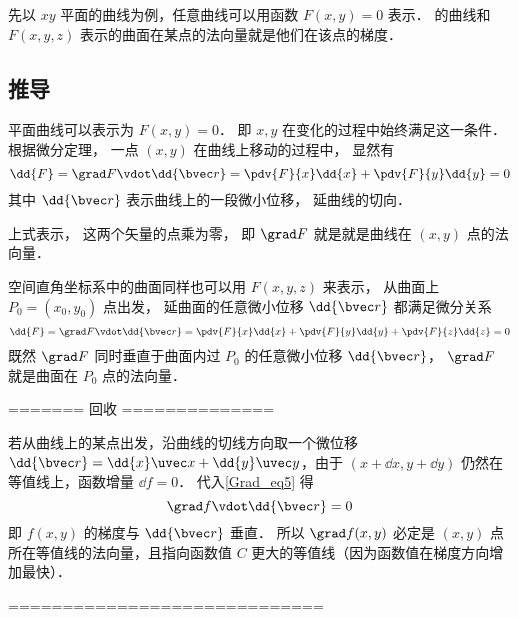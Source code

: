 
\begin{issues}
\issueDraft
\end{issues}


先以 $xy$ 平面的曲线为例，任意曲线可以用函数 $F(x, y) = 0$ 表示． 的曲线和 $F(x, y, z)$ 表示的曲面在某点的法向量就是他们在该点的梯度．

\subsection{推导}

平面曲线可以表示为 $F(x, y) = 0$． 即 $x, y$ 在变化的过程中始终满足这一条件． 根据微分定理， 一点 $(x, y)$ 在曲线上移动的过程中， 显然有
\begin{equation}
\dd{F} = \grad F \vdot \dd{\bvec r} = \pdv{F}{x} \dd{x} + \pdv{F}{y} \dd{y} = 0
\end{equation}
其中 $\dd{\bvec r}$ 表示曲线上的一段微小位移， 延曲线的切向．

上式表示， 这两个矢量的点乘为零， 即 $\grad F$ 就是就是曲线在 $(x,y)$ 点的法向量．

空间直角坐标系中的曲面同样也可以用 $F(x, y, z)$ 来表示， 从曲面上 $P_0 = (x_0, y_0)$ 点出发， 延曲面的任意微小位移 $\dd{\bvec r}$ 都满足微分关系
\begin{equation}
\dd{F} = \grad F \vdot \dd{\bvec r} = \pdv{F}{x} \dd{x} + \pdv{F}{y} \dd{y} + \pdv{F}{z} \dd{z} = 0
\end{equation}
既然 $\grad F$ 同时垂直于曲面内过 $P_0$ 的任意微小位移 $\dd{\bvec r}$， $\grad F$ 就是曲面在 $P_0$ 点的法向量．

======= 回收 ==============

若从曲线上的某点出发，沿曲线的切线方向取一个微位移 $\dd{\bvec r} = \dd{x}\uvec x + \dd{y} \uvec y$，由于 $(x+\dd{x}, y+\dd{y})$ 仍然在等值线上，函数增量 $\dd{f} = 0$． 代入\autoref{Grad_eq5} 得
\begin{equation}
\grad f \vdot \dd{\bvec r} = 0
\end{equation}
即 $f(x,y)$ 的梯度与 $\dd{\bvec r}$ 垂直． 所以 $\grad f(x,y)$ 必定是 $(x,y)$ 点所在等值线的法向量，且指向函数值 $C$ 更大的等值线（因为函数值在梯度方向增加最快）．

=============================

